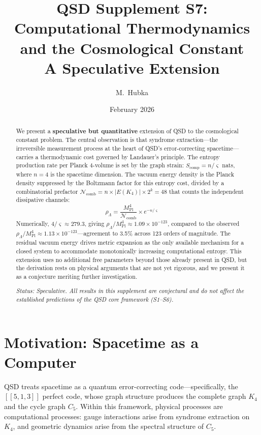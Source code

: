 \documentclass[11pt,a4paper]{article}
\title{\textbf{QSD Supplement S7: Computational Thermodynamics\\
and the Cosmological Constant}\\[0.5em]
\Large A Speculative Extension}
\author{M.\ Hubka}
\date{February 2026}
\theoremstyle{definition}
\newcommand{\gs}{\varsigma}                %
\newcommand{\Mpl}{M_{\text{Pl}}}
\newcommand{\rhoL}{\rho_{\Lambda}}
\newcommand{\Ncomb}{\mathcal{N}_{\text{comb}}}
\begin{document}
\maketitle

\begin{abstract}
We present a \textbf{speculative but quantitative} extension of QSD to the cosmological constant problem. The central observation is that syndrome extraction---the irreversible measurement process at the heart of QSD's error-correcting spacetime---carries a thermodynamic cost governed by Landauer's principle. The entropy production rate per Planck 4-volume is set by the graph strain: $S_{\text{comp}} = n/\gs$ nats, where $n = 4$ is the spacetime dimension. The vacuum energy density is the Planck density suppressed by the Boltzmann factor for this entropy cost, divided by a combinatorial prefactor $\Ncomb = n \times |E(K_4)| \times 2^k = 48$ that counts the independent dissipative channels:
\[
    \rhoL = \frac{\Mpl^4}{\Ncomb} \times e^{-n/\gs}
\]
Numerically, $4/\gs \approx 279.3$, giving $\rhoL/\Mpl^4 \approx 1.09 \times 10^{-123}$, compared to the observed $\rhoL/\Mpl^4 \approx 1.13 \times 10^{-123}$---agreement to 3.5\% across 123 orders of magnitude. The residual vacuum energy drives metric expansion as the only available mechanism for a closed system to accommodate monotonically increasing computational entropy. This extension uses no additional free parameters beyond those already present in QSD, but the derivation rests on physical arguments that are not yet rigorous, and we present it as a conjecture meriting further investigation.

\medskip
\noindent\textit{Status: Speculative.  All results in this supplement are conjectural and do not affect the established predictions of the QSD core framework (S1--S6).}
\end{abstract}

\tableofcontents

\section{Motivation: Spacetime as a Computer}

QSD treats spacetime as a quantum error-correcting code---specifically, the $[[5,1,3]]$ perfect code, whose graph structure produces the complete graph $K_4$ and the cycle graph $C_5$. Within this framework, physical processes are computational processes: gauge interactions arise from syndrome extraction on $K_4$, and geometric dynamics arise from the spectral structure of $C_5$.
\end{document}
